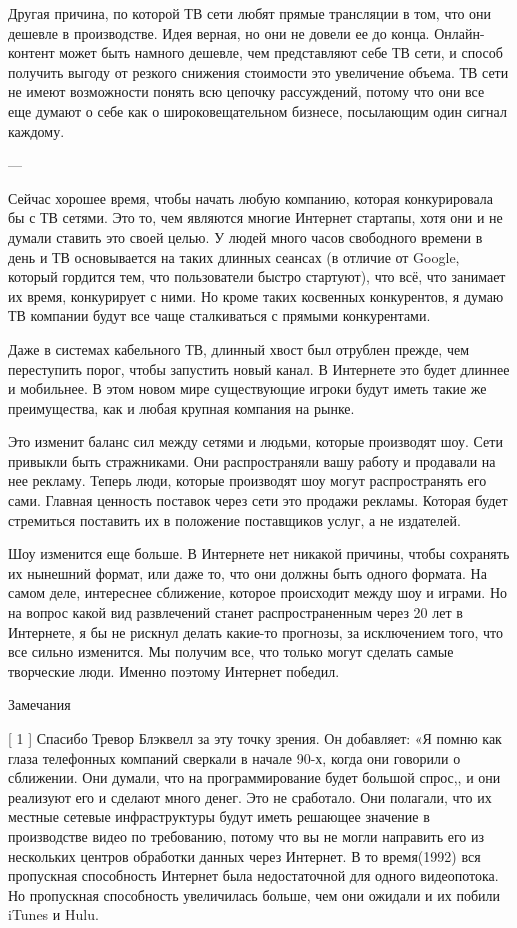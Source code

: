 \documentclass[ebook,12pt,oneside,openany]{memoir}
\begin{document}
Другая причина, по которой ТВ сети любят прямые трансляции в том, что
они дешевле в производстве. Идея верная, но они не довели ее до конца.
Онлайн-контент может быть намного дешевле, чем представляют себе ТВ
сети, и способ получить выгоду от резкого снижения стоимости это
увеличение объема. ТВ сети не имеют возможности понять всю цепочку
рассуждений, потому что они все еще думают о себе как о
широковещательном бизнесе, посылающим один сигнал каждому.

---

Сейчас хорошее время, чтобы начать любую компанию, которая
конкурировала бы с ТВ сетями. Это то, чем являются многие Интернет
стартапы, хотя они и не думали ставить это своей целью. У людей много
часов свободного времени в день и ТВ основывается на таких длинных
сеансах (в отличие от Google, который гордится тем, что пользователи
быстро стартуют), что всё, что занимает их время, конкурирует с ними.
Но кроме таких косвенных конкурентов, я думаю ТВ компании будут все
чаще сталкиваться с прямыми конкурентами.

Даже в системах кабельного ТВ, длинный хвост был отрублен прежде, чем
переступить порог, чтобы запустить новый канал. В Интернете это будет
длиннее и мобильнее. В этом новом мире существующие игроки будут иметь
такие же преимущества, как и любая крупная компания на рынке.

Это изменит баланс сил между сетями и людьми, которые производят шоу.
Сети привыкли быть стражниками. Они распространяли вашу работу и
продавали на нее рекламу. Теперь люди, которые производят шоу могут
распространять его сами. Главная ценность поставок через сети это
продажи рекламы. Которая будет стремиться поставить их в положение
поставщиков услуг, а не издателей.

Шоу изменится еще больше. В Интернете нет никакой причины, чтобы
сохранять их нынешний формат, или даже то, что они должны быть одного
формата. На самом деле, интереснее сближение, которое происходит между
шоу и играми. Но на вопрос какой вид развлечений станет
распространенным через 20 лет в Интернете, я бы не рискнул делать
какие-то прогнозы, за исключением того, что все сильно изменится. Мы
получим все, что только могут сделать самые творческие люди. Именно
поэтому Интернет победил.

Замечания

[ 1 ] Спасибо Тревор Блэквелл за эту точку зрения. Он добавляет: «Я
помню как глаза телефонных компаний сверкали в начале 90-х, когда они
говорили о сближении. Они думали, что на программирование будет
большой спрос,, и они реализуют его и сделают много денег. Это не
сработало. Они полагали, что их местные сетевые инфраструктуры будут
иметь решающее значение в производстве видео по требованию, потому что
вы не могли направить его из нескольких центров обработки данных через
Интернет. В то время(1992) вся пропускная способность Интернет была
недостаточной для одного видеопотока. Но пропускная способность
увеличилась больше, чем они ожидали и их побили iTunes и Hulu.
\end{document}
